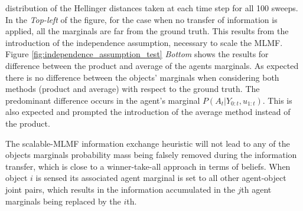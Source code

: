 distribution of the Hellinger distances taken at each time step for all 100 sweeps. In the \textit{Top-left} of the figure, 
for the case when no transfer of information is applied, all the marginals are far from the 
ground truth. This results from the introduction of the independence assumption, necessary to scale the MLMF. 
Figure \ref{fig:independence_assumption_test} \textit{Bottom} shows the results for difference between the product and average of the agents
marginals. As expected there is no difference between the objects' marginals when considering both methods (product and average) with respect
to the ground truth. The predominant difference occurs in the agent's marginal $P(A_t|Y_{0:t},u_{1:t})$. This is also expected and 
prompted the introduction of the average method instead of the product. 

The scalable-MLMF information exchange heuristic will not lead to any of the objects marginals probability mass being falsely  
removed during the information transfer, which is close to a winner-take-all approach in terms of beliefs.
When object $i$ is sensed its associated agent marginal is set to all other agent-object joint pairs, which results in the 
information accumulated in the $j$th agent marginals being replaced by the $i$th.

